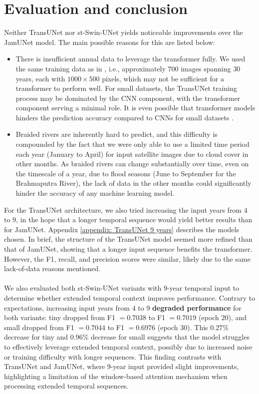 \documentclass[10pt,oneside,a4paper,english]{article}
\begin{document}
\section{Evaluation and conclusion} \label{section: Evaluation and conclusion}
Neither TransUNet nor st-Swin-UNet yields noticeable improvements over the JamUNet model. The main possible reasons for this are listed below:
\begin{itemize}
    \item There is insufficient annual data to leverage the transformer fully. We used the same training data as in \cite{magherini2024jamunet}, i.e., approximately $700$ images spanning $30$ years, each with $1000 \times 500$ pixels, which may not be sufficient for a transformer to perform well. For small datasets, the TransUNet training process may be dominated by the CNN component, with the transformer component serving a minimal role. It is even possible that transformer models hinders the prediction accuracy compared to CNNs for small datasets \cite{akkaya2024enhancing}.
    \item Braided rivers are inherently hard to predict, and this difficulty is compounded by the fact that we were only able to use a limited time period each year (January to April) for input satellite images due to cloud cover in other months. As braided rivers can change substantially over time, even on the timescale of a year, due to flood seasons (June to September for the Brahmaputra River), the lack of data in the other months could significantly hinder the accuracy of any machine learning model.
\end{itemize}
For the TransUNet architecture, we also tried increasing the input years from $4$ to $9$, in the hope that a longer temporal sequence would yield better results than for JamUNet. Appendix \ref{appendix: TransUNet 9 years} describes the models chosen. In brief, the structure of the TransUNet model seemed more refined than that of JamUNet, showing that a longer input sequence benefits the transformer. However, the F1, recall, and precision scores were similar, likely due to the same lack-of-data reasons mentioned. \\
\\
We also evaluated both st-Swin-UNet variants with $9$-year temporal input to determine whether extended temporal context improves performance. Contrary to expectations, increasing input years from $4$ to $9$ \textbf{degraded performance} for both variants: tiny dropped from F1 $= 0.7038$ to F1 $= 0.7019$ (epoch $20$), and small dropped from F1 $= 0.7044$ to F1 $= 0.6976$ (epoch $30$). This $0.27\%$ decrease for tiny and $0.96\%$ decrease for small suggests that the model struggles to effectively leverage extended temporal context, possibly due to increased noise or training difficulty with longer sequences. This finding contrasts with TransUNet and JamUNet, where $9$-year input provided slight improvements, highlighting a limitation of the window-based attention mechanism when processing extended temporal sequences. \\
\end{document}
